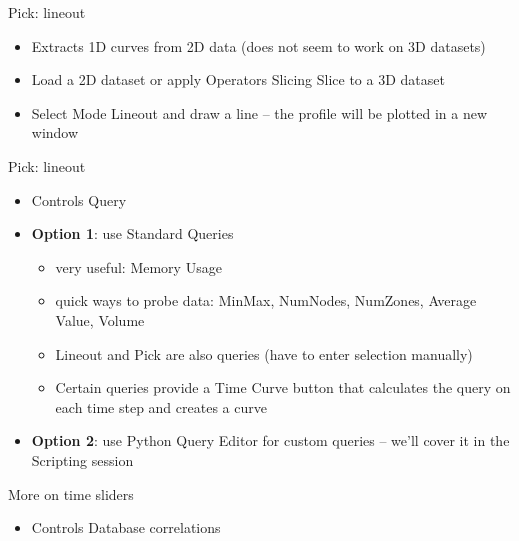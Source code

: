 \begin{frame}{Pick: lineout}
  \begin{itemize}\setlength{\itemsep}{2mm}
  \item Extracts 1D curves from 2D data (does not seem to work on 3D datasets)
  \item Load a 2D dataset or apply Operators \ra Slicing \ra Slice to a 3D dataset
  \item Select Mode \ra Lineout and draw a line -- the profile will be plotted in a new window
  \end{itemize}
\end{frame}


\begin{frame}{Pick: lineout}
  \begin{itemize}\setlength{\itemsep}{2mm}
  \item Controls \ra Query
  \item {\bf Option 1}: use Standard Queries
    \begin{itemize}\setlength{\itemsep}{0mm}
    \item very useful: Memory Usage
    \item quick ways to probe data: MinMax, NumNodes, NumZones, Average Value, Volume
    \item Lineout and Pick are also queries (have to enter selection manually)
    \item Certain queries provide a Time Curve button that calculates the query on each time step and
      creates a curve
    \end{itemize}
  \item {\bf Option 2}: use Python Query Editor for custom queries -- we'll cover it in the Scripting
    session
  \end{itemize}
\end{frame}

\begin{frame}{More on time sliders}
  \begin{itemize}\setlength{\itemsep}{2mm}
  \item Controls \ra Database correlations
  \end{itemize}
\end{frame}
